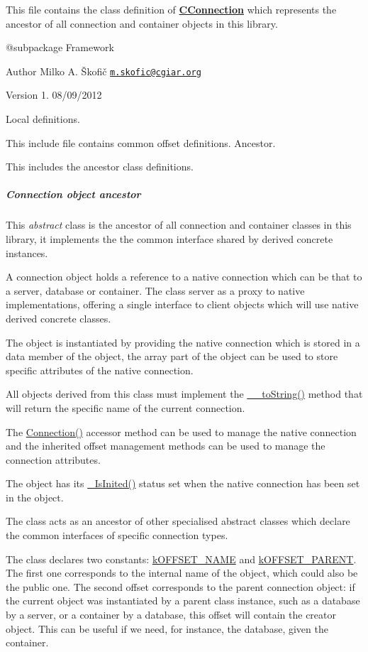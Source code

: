 This file contains the class definition of {\bfseries \hyperlink{class_c_connection}{C\-Connection}} which represents the ancestor of all connection and container objects in this library.

\begin{DoxyVerb} @subpackage        Framework
\end{DoxyVerb}


\begin{DoxyAuthor}{Author}
Milko A. Škofič \href{mailto:m.skofic@cgiar.org}{\tt m.\-skofic@cgiar.\-org} 
\end{DoxyAuthor}
\begin{DoxyVersion}{Version}
1. 08/09/2012
\end{DoxyVersion}
Local definitions.

This include file contains common offset definitions. Ancestor.

This includes the ancestor class definitions. \subparagraph*{Connection object ancestor}

This {\itshape abstract} class is the ancestor of all connection and container classes in this library, it implements the the common interface shared by derived concrete instances.

A connection object holds a reference to a native connection which can be that to a server, database or container. The class server as a proxy to native implementations, offering a single interface to client objects which will use native derived concrete classes.

The object is instantiated by providing the native connection which is stored in a data member of the object, the array part of the object can be used to store specific attributes of the native connection.

All objects derived from this class must implement the \hyperlink{}{\-\_\-\-\_\-to\-String()} method that will return the specific name of the current connection.

The \hyperlink{}{Connection()} accessor method can be used to manage the native connection and the inherited offset management methods can be used to manage the connection attributes.

The object has its \hyperlink{}{\-\_\-\-Is\-Inited()} status set when the native connection has been set in the object.

The class acts as an ancestor of other specialised abstract classes which declare the common interfaces of specific connection types.

The class declares two constants\-: \hyperlink{}{k\-O\-F\-F\-S\-E\-T\-\_\-\-N\-A\-M\-E} and \hyperlink{}{k\-O\-F\-F\-S\-E\-T\-\_\-\-P\-A\-R\-E\-N\-T}. The first one corresponds to the internal name of the object, which could also be the public one. The second offset corresponds to the parent connection object\-: if the current object was instantiated by a parent class instance, such as a database by a server, or a container by a database, this offset will contain the creator object. This can be useful if we need, for instance, the database, given the container.

